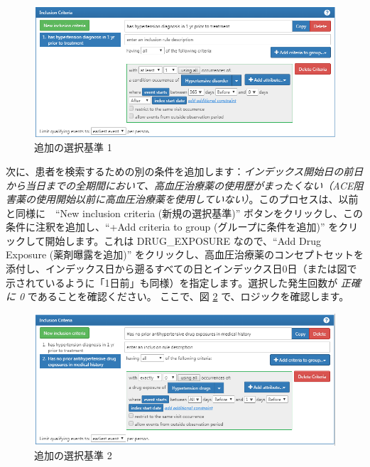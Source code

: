 \documentclass[
  11pt]{book}
\theoremstyle{definition}
\theoremstyle{definition}
\theoremstyle{definition}
\theoremstyle{definition}
\theoremstyle{remark}
\begin{document}
\begin{figure}

{\centering \includegraphics[width=1\linewidth]{images/Cohorts/ATLAS-IC1} 

}

\caption{追加の選択基準 1}\label{fig:ATLASIC1}
\end{figure}

次に、患者を検索するための別の条件を追加します：\emph{インデックス開始日の前日から当日までの全期間において、高血圧治療薬の使用歴がまったくない（ACE阻害薬の使用開始以前に高血圧治療薬を使用していない）}。このプロセスは、以前と同様に　``New inclusion criteria (新規の選択基準)'' ボタンをクリックし、この条件に注釈を追加し、``+Add criteria to group (グループに条件を追加)'' をクリックして開始します。これは DRUG\_EXPOSURE なので、``Add Drug Exposure (薬剤曝露を追加)'' をクリックし、高血圧治療薬のコンセプトセットを添付し、インデックス日から遡るすべての日とインデックス日0日（または図で示されているように「1日前」も同様）を指定します。選択した発生回数が \emph{正確に 0} であることを確認ください。 ここで、図 \ref{fig:ATLASIC2} で、ロジックを確認します。

\begin{figure}

{\centering \includegraphics[width=1\linewidth]{images/Cohorts/ATLAS-IC2} 

}

\caption{追加の選択基準 2}\label{fig:ATLASIC2}
\end{figure}
\end{document}
